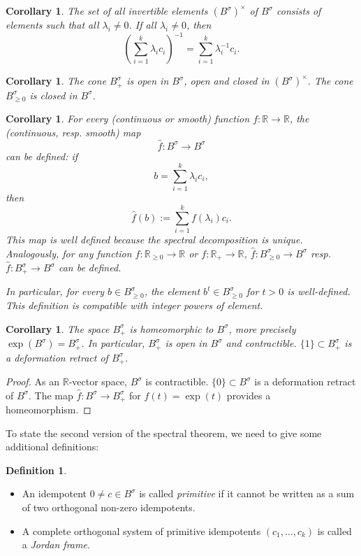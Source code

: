 \documentclass[a4paper,oneside,11pt]{amsart}
\newcommand{\R}{\mathbb R}
\theoremstyle{plain}
\newtheorem{cor}[teo]{Corollary}
\theoremstyle{definition}
\newtheorem{df}[teo]{Definition}
\theoremstyle{remark}
\newcommand{\defin}{\emph}
\begin{document}
\begin{cor}
The set of all invertible elements $(B^{\sigma})^\times$ of $B^{\sigma}$ consists of elements such that all $\lambda_i\neq 0$. If all $\lambda_i\neq 0$, then
$$\left(\sum_{i=1}^k\lambda_ic_i\right)^{-1}=\sum_{i=1}^k\lambda_i^{-1}c_i.$$
\end{cor}

\begin{cor}
The cone $B^{\sigma}_+$ is open in $B^{\sigma}$, open and closed in $(B^{\sigma})^\times$. The cone $B^{\sigma}_{\geq 0}$ is closed in $B^{\sigma}$.
\end{cor}


\begin{cor}
For every (continuous or smooth) function $f\colon \R \to \R$, the (continuous, resp. smooth) map
$$\hat f\colon B^{\sigma} \to B^{\sigma}$$
can be defined: if
$$b=\sum_{i=1}^k\lambda_ic_i,$$
then
$$\hat f(b):=\sum_{i=1}^k f(\lambda_i)c_i.$$
This map is well defined because the spectral decomposition is unique. Analogously, for any function $f\colon \R_{\geq 0} \to \R$ or $f\colon \R_+ \to \R$, $\hat f\colon B^{\sigma}_{\geq 0} \to B^{\sigma}$ resp. $\hat f\colon B^{\sigma}_+ \to B^{\sigma}$ can be defined.

In particular, for every $b\in B^{\sigma}_{\geq 0}$, the element $b^t\in B^{\sigma}_{\geq 0}$ for $t>0$ is well-defined. This definition is compatible with integer powers of element.
\end{cor}

\begin{cor}\label{Bsym+_contr_open}
The space $B^{\sigma}_+$ is homeomorphic to $B^{\sigma}$, more precisely $\exp(B^{\sigma})=B^{\sigma}_+$. In particular, $B^{\sigma}_+$ is open in $B^{\sigma}$ and contractible. $\{1\}\subset B^{\sigma}_+$ is a deformation retract of $B^{\sigma}_+$.
\end{cor}

\begin{proof}
As an $\R$-vector space, $B^{\sigma}$ is contractible. $\{0\}\subset B^{\sigma}$ is a deformation retract of $B^{\sigma}$. The map $\hat f\colon B^{\sigma}\to B^{\sigma}_+$ for $f(t)=\exp(t)$ provides a homeomorphism.
\end{proof}


To state the second version of the spectral theorem, we need to give some additional definitions:

\begin{df}\begin{itemize}
\item An idempotent $0\neq c\in B^{\sigma}$ is called \defin{primitive} if it cannot be written as a sum of two orthogonal non-zero idempotents.
\item A complete orthogonal system of primitive idempotents $(c_1,\dots,c_k)$ is called a \defin{Jordan frame}.
\end{itemize}
\end{df}
\end{document}
